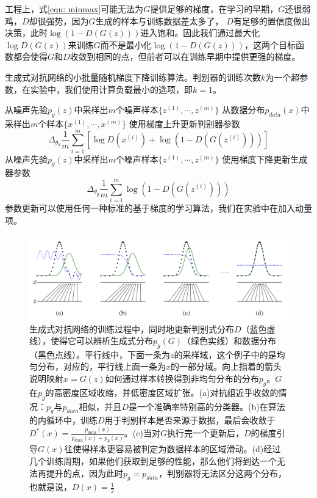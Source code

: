 \documentclass[UTF8]{ctexart}
\begin{document}
工程上，式\eqref{equ: minmax}可能无法为$G$提供足够的梯度，在学习的早期，$G$还很弱鸡，$D$却很强势，因为$G$生成的样本与训练数据差太多了， $D$有足够的置信度做出决策，此时$\log(1-D(G(z)))$进入饱和。因此我们通过最大化$\log D(G(z))$来训练$G$而不是最小化$\log(1-D(G(z)))$，这两个目标函数都会使得$G$和$D$收敛到相同的点，但前者可以在训练早期中提供更强的梯度。

\begin{algorithm}
\caption{生成式对抗网络的小批量随机梯度下降训练算法。判别器的训练次数$k$为一个超参数，在实验中，我们使用计算负载最小的选项，即$k=1$。} 
\label{alg1}       
\begin{algorithmic} 
\STATE 从噪声先验$p_g(z)$中采样出$m$个噪声样本$\{z^{(1)}, \cdots, z^{(m)}\}$
\STATE 从数据分布$p_{data}(x)$中采样出$m$个样本$\{x^{(1)}, \cdots, x^{(m)}\}$
\STATE 使用梯度上升更新判别器参数
\begin{equation*}
\Delta_{\theta_d}\frac{1}{m}\sum\limits_{i=1}^m[\log D(x^{(i)}) + \log(1 - D(G(z^{(i)})))]
\end{equation*}
\ENDFOR
\STATE 从噪声先验$p_g(z)$中采样出$m$个噪声样本$\{z^{(1)}, \cdots, z^{(m)}\}$
\STATE 使用梯度下降更新生成器参数
\begin{equation*}
\Delta_{\theta_g}\frac{1}{m}\sum\limits_{i=1}^m \log(1 - D(G(z^{(i)})))
\end{equation*}
\ENDFOR
\STATE 参数更新可以使用任何一种标准的基于梯度的学习算法，我们在实验中在加入动量项。
\end{algorithmic}
\end{algorithm}



\begin{figure}[htbp]
\begin{center}
\includegraphics[width=0.9\linewidth]{image/figure.png}
\end{center}
\caption{生成式对抗网络的训练过程中，同时地更新判别式分布$D$（蓝色虚线），使得它可以辨析生成式分布$p_g(G)$（绿色实线）和数据分布（黑色点线）。平行线中，下面一条为$z$的采样域，这个例子中的是均匀分布，对应的，平行线上面一条为$x$的一部分域。向上指着的箭头说明映射$x = G(z)$如何通过样本转换得到非均匀分布的分布$p_g$。$G$在$p_g$的高密度区域收缩，并低密度区域扩张。(a)对抗组近乎收敛的情况：$p_g$与$p_{data}$相似，并且$D$是一个准确率特别高的分类器。(b)在算法的内循环中，训练$D$用于判别样本是否来源于数据，最后会收敛于$D^*(x)=\frac{p_{data}(x)}{p_{data}(x) + p_g(x)}$。(c)当对$G$执行完一个更新后，$D$的梯度引导$G(x)$往使得样本更容易被判定为数据样本的区域滑动。(d)经过几个训练周期，如果他们获取到足够的性能，那么他们将到达一个无法再提升的点，因为此时$p_g = p_{data}$，判别器将无法区分这两个分布，也就是说，$D(x) = \frac{1}{2}$}
\label{img: figure}
\end{figure}
\end{document}
